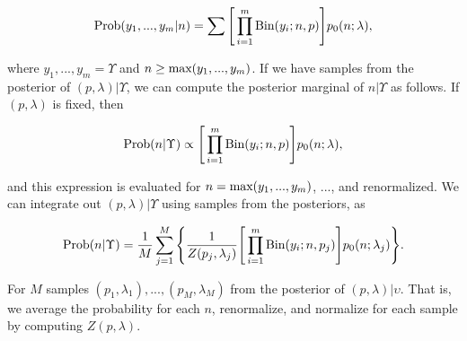 \documentclass[codesnippet]{jss}
\begin{document}
$$\textnormal{Prob} (y_1, ..., y_m|n) = \sum \Bigg[ \prod_{i=1}^{m} \textnormal{Bin} (y_i; n, p) \Bigg] p_0(n; \lambda),$$

where $y_1, ..., y_m = \Upsilon$ and $n \geq \textnormal{max} (y_1, ..., y_m)$. If we have samples from the posterior of $(p, \lambda) | \Upsilon$, we can compute the posterior marginal of $n | \Upsilon$ as follows. If $(p, \lambda)$ is fixed, then

$$\textnormal{Prob} (n | \Upsilon) \propto \Bigg[ \prod_{i=1}^{m} \textnormal{Bin} (y_i; n, p) \Bigg] p_0 (n; \lambda),$$

and this expression is evaluated for $n=\textnormal{max}(y_1, ..., y_m)$, ..., and renormalized. We can integrate out $(p, \lambda) | \Upsilon$ using samples from the posteriors, as

$$\textnormal{Prob} (n | \Upsilon) = \frac{1}{M}  \sum_{j=1}^{M} \Bigg\{ \frac{1}{Z(p_j,\lambda_j)}  \Bigg[ \prod_{i=1}^{m} \textnormal{Bin} (y_i; n, p_j) \Bigg] p_0 (n; \lambda_j) \Bigg\}.$$

For $M$ samples $(p_1, \lambda_1), ..., (p_M, \lambda_M)$ from the posterior of $(p, \lambda) | \upsilon$. That is, we average the probability for each $n$, renormalize, and normalize for each sample by computing $Z (p, \lambda)$. 
	
	
\end{document}
